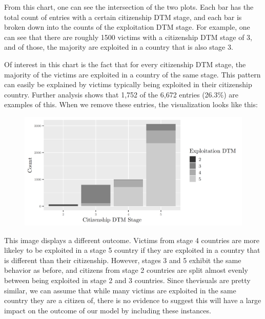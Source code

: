\documentclass{article} %
\begin{document}
From this chart, one can see the intersection of the two plots. Each bar has the total count of entries with a certain citizenship DTM stage, and each bar is broken down into the counts of the exploitation DTM stage. For example, one can see that there are roughly 1500 victims with a citizenship DTM stage of 3, and of those, the majority are exploited in a country that is also stage 3.

Of interest in this chart is the fact that for every citizenship DTM stage, the majority of the victims are exploited in a country of the same stage. This pattern can easily be explained by victims typically being exploited in their citizenship country. Further analysis shows that 1,752 of the 6,672 entries (26.3\%) are examples of this. When we remove these entries, the visualization looks like this:

\FloatBarrier
\begin{figure}[H]
	\includegraphics[width = \textwidth]{Different_CountryDTM}
\end{figure}
\FloatBarrier

This image displays a different outcome. Victims from stage 4 countries are more likeley to be exploited in a stage 5 country if they are exploited in a country that is different than their citizenship. However, stages 3 and 5 exhibit the same behavior as before, and citizens from stage 2 countries are split almost evenly between being exploited in stage 2 and 3 countries. Since thevisuals are pretty similar, we can assume that while many victims are exploited in the same country they are a citizen of, there is no evidence to suggest this will have a large impact on the outcome of our model by including these instances. 
\end{document}
